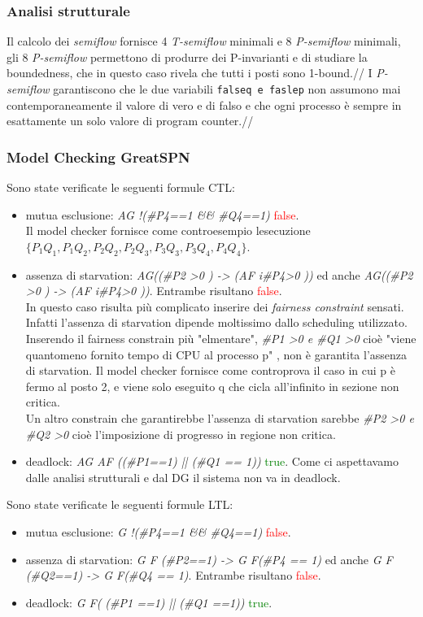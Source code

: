\documentclass[a4paper]{article}
\begin{document}
\subsubsection{Analisi strutturale}
\label{SEC:3_8_strutturale}
Il calcolo dei \textit{semiflow} fornisce 4 \textit{T-semiflow} minimali e 8 \textit{P-semiflow} minimali, gli 8 \textit{P-semiflow} permettono di produrre dei P-invarianti e di studiare la boundedness, che in questo caso rivela che tutti i posti sono 1-bound.//
I \textit{P-semiflow} garantiscono che le due variabili \texttt{falseq \texttt{e} faslep} non assumono mai contemporaneamente il valore di vero e di falso e che ogni processo è sempre in esattamente un solo valore di program counter.//

\subsubsection{Model Checking GreatSPN}
Sono state verificate le seguenti formule CTL:
\begin{itemize}
	\item mutua esclusione: \textit{AG !(\#P4==1 \&\& \#Q4==1)} \textcolor{red}{false}.\\
		Il model checker fornisce come controesempio lesecuzione $\{P_1 Q_1,P_1 Q_2,P_2 Q_2,P_2 Q_3,P_3 Q_3,P_3 Q_4,P_4 Q_4\}$.
	\item assenza di starvation: \textit{AG((\#P2 >0 ) -> (AF i\#P4>0 ))} ed anche \textit{AG((\#P2 >0 ) -> (AF i\#P4>0 ))}. Entrambe risultano \textcolor{red}{false}.\\
		In questo caso risulta più complicato inserire dei \textit{fairness constraint} sensati. Infatti l'assenza di starvation dipende moltissimo dallo scheduling utilizzato.  
		Inserendo il fairness constrain più "elmentare", \textit{\#P1 >0 \textit{e} \#Q1 >0} cioè "viene quantomeno fornito tempo di CPU al processo p" , non è garantita l'assenza di starvation. Il model checker fornisce come controprova il caso in cui p è fermo al posto 2, e viene solo eseguito q che cicla all'infinito in sezione non critica.\\ %
		Un altro constrain che garantirebbe l'assenza di starvation sarebbe \textit{\#P2 >0 \textit{e} \#Q2 >0} cioè l'imposizione di progresso in regione non critica.%
	\item deadlock: \textit{AG AF ((\#P1==1) || (\#Q1 == 1))} \textcolor{green}{true}. Come ci aspettavamo dalle analisi strutturali e dal DG il sistema non va in deadlock.
\end{itemize}
Sono state verificate le seguenti formule LTL:
\begin{itemize}
	\item mutua esclusione: \textit{G !(\#P4==1 \&\& \#Q4==1)} \textcolor{red}{false}.
	\item assenza di starvation: \textit{G F (\#P2==1) -> G F(\#P4 == 1)} ed anche \textit{G F (\#Q2==1) -> G F(\#Q4 == 1)}. Entrambe risultano \textcolor{red}{false}.\\
	\item deadlock: \textit{G F( (\#P1 ==1) ||  (\#Q1 ==1))} \textcolor{green}{true}.
\end{itemize}
\end{document}
